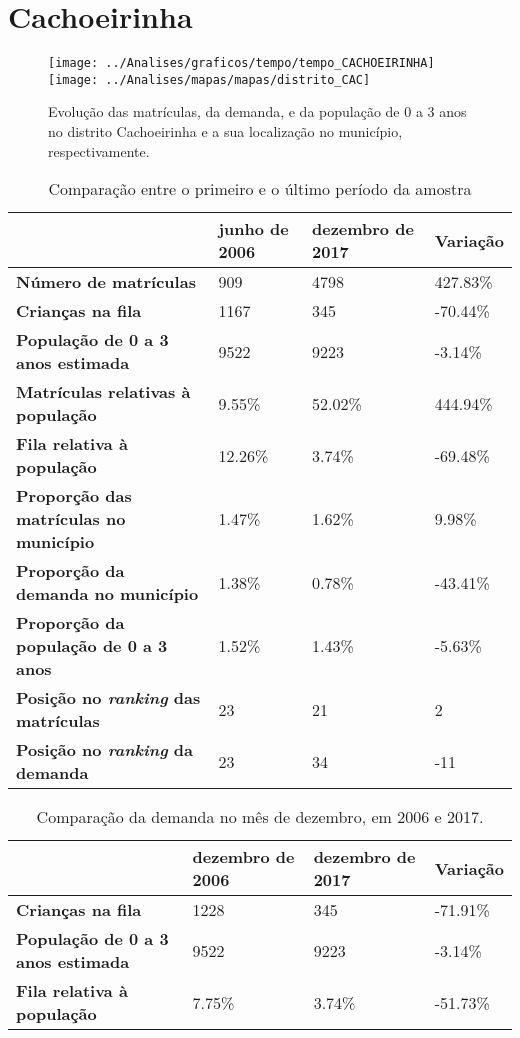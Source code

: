 \section{Cachoeirinha}
\begin{figure}[H]
	\centering
	\texttt{[image: ../Analises/graficos/tempo/tempo\_CACHOEIRINHA]}
	\texttt{[image: ../Analises/mapas/mapas/distrito\_CAC]}
	\caption{Evolução das matrículas, da demanda, e da população de 0 a 3 anos no distrito Cachoeirinha e a sua localização no município, respectivamente.}
\end{figure}
\begin{table}[H]
	\begin{tabular}{|l|l|l|l|}
		\hline
		\textbf{}                                      & \textbf{junho de 2006}       & \textbf{dezembro de 2017}    & \textbf{Variação} \\ \hline
		\textbf{Número de matrículas}                  & 909 & 4798 & 427.83\% \\ \hline
		\textbf{Crianças na fila}                      & 1167 & 345 & -70.44\% \\ \hline
		\textbf{População de 0 a 3 anos estimada}      & 9522 & 9223 & -3.14\% \\ \hline
		\textbf{Matrículas relativas à população}      & 9.55\% & 52.02\% & 444.94\% \\ \hline
		\textbf{Fila relativa à população}             & 12.26\% & 3.74\% & -69.48\% \\ \hline
		\textbf{Proporção das matrículas no município} & 1.47\% & 1.62\% & 9.98\% \\ \hline
		\textbf{Proporção da demanda no município}     & 1.38\% & 0.78\% & -43.41\% \\ \hline
		\textbf{Proporção da população de 0 a 3 anos}  & 1.52\% & 1.43\% & -5.63\% \\ \hline
		\textbf{Posição no \textit{ranking} das matrículas}     & 23 & 21 & 2 \\ \hline
		\textbf{Posição no \textit{ranking} da demanda}         & 23 & 34 & -11 \\ \hline
	\end{tabular}
	\caption{Comparação entre o primeiro e o último período da amostra}
\end{table}
\begin{table}[H]
	\begin{tabular}{|l|l|l|l|}
		\hline
		\textbf{}                                 & \textbf{dezembro de 2006} & \textbf{dezembro de 2017} & \textbf{Variação} \\ \hline
		\textbf{Crianças na fila}                      & 1228 & 345 & -71.91\% \\ \hline
		\textbf{População de 0 a 3 anos estimada}      & 9522 & 9223 & -3.14\% \\ \hline
		\textbf{Fila relativa à população}             & 7.75\% & 3.74\% & -51.73\% \\ \hline
	\end{tabular}
	\caption{Comparação da demanda no mês de dezembro, em 2006 e 2017.}
\end{table}
